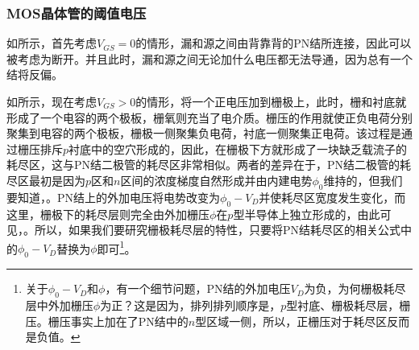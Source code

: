 \subsubsection{MOS晶体管的阈值电压}

如所示，首先考虑$V_{GS}=0$的情形，漏和源之间由背靠背的PN结所连接，因此可以被考虑为断开。并且此时，漏和源之间无论加什么电压都无法导通，因为总有一个结将反偏。

如所示，现在考虑$V_{GS}>0$的情形，将一个正电压加到栅极上，此时，栅和衬底就形成了一个电容的两个极板，栅氧则充当了电介质。栅压的作用就使正负电荷分别聚集到电容的两个极板，栅极一侧聚集负电荷，衬底一侧聚集正电荷。该过程是通过栅压排斥$p$衬底中的空穴形成的，因此，在栅极下方就形成了一块缺乏载流子的耗尽区，这与PN结二极管的耗尽区非常相似。两者的差异在于，PN结二极管的耗尽区最初是因为$p$区和$n$区间的浓度梯度自然形成并由内建电势$\phi_0$维持的，但我们要知道，。PN结上的外加电压将电势改变为$\phi_0-V_D$并使耗尽区宽度发生变化，而这里，栅极下的耗尽层则完全由外加栅压$\phi$在$p$型半导体上独立形成的，由此可见，。所以，如果我们要研究栅极耗尽层的特性，只要将PN结耗尽区的相关公式中的$\phi_0-V_D$替换为$\phi$即可\footnote{关于$\phi_0-V_D$和$\phi$，有一个细节问题，PN结的外加电压$V_D$为负，为何栅极耗尽层中外加栅压$\phi$为正？这是因为，排列排列顺序是，$p$型衬底、栅极耗尽层，栅压。栅压事实上加在了PN结中的$n$型区域一侧，所以，正栅压对于耗尽区反而是负值。}。